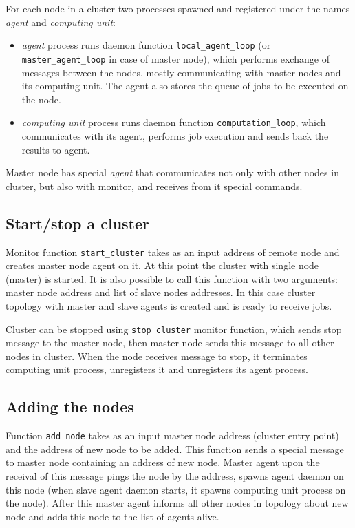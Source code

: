 \documentclass[12pt]{article}
\begin{document}
For each node in a cluster two processes spawned and registered under the names \emph{agent} and \emph{computing unit}:
\begin{itemize}
	\item \emph{agent} process runs daemon function \texttt{local\_agent\_loop} (or \texttt{master\_agent\_loop} in case of master node), which performs exchange of messages between the nodes, mostly communicating with master nodes and its computing unit. The agent also stores the queue of jobs to be executed on the node.
	\item \emph{computing unit} process runs daemon function \texttt{computation\_loop}, which communicates with its agent, performs job execution and sends back the results to agent.
\end{itemize}

Master node has special \emph{agent} that communicates not only with other nodes in cluster, but also with monitor, and receives from it special commands.

\subsection{Start/stop a cluster}

Monitor function \texttt{start\_cluster} takes as an input address of remote node and creates master node agent on it. At this point the cluster with single node (master) is started. It is also possible to call this function with two arguments: master node address and list of slave nodes addresses. In this case cluster topology with master and slave agents is created and is ready to receive jobs.

Cluster can be stopped using \texttt{stop\_cluster} monitor function, which sends stop message to the master node, then master node sends this message to all other nodes in cluster. When the node receives message to stop, it terminates computing unit process, unregisters it and unregisters its agent process. 

\subsection{Adding the nodes}

Function \texttt{add\_node} takes as an input master node address (cluster entry point) and the address of new node to be added. This function sends a special message to master node containing an address of new node. Master agent upon the receival of this message pings the node by the address, spawns agent daemon on this node (when slave agent daemon starts, it spawns computing unit process on the node). After this master agent informs all other nodes in topology about new node and adds this node to the list of agents alive.
\end{document}
